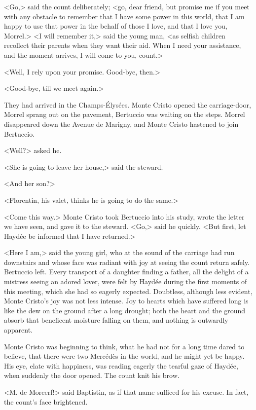  <Go,> said the count deliberately; <go, dear friend, but promise me if you meet with any obstacle to remember that I have some power in this world, that I am happy to use that power in the behalf of those I love, and that I love you, Morrel.>  <I will remember it,> said the young man, <as selfish children recollect their parents when they want their aid. When I need your assistance, and the moment arrives, I will come to you, count.> 

 <Well, I rely upon your promise. Good-bye, then.> 

 <Good-bye, till we meet again.> 

 They had arrived in the Champs-Élysées. Monte Cristo opened the carriage-door, Morrel sprang out on the pavement, Bertuccio was waiting on the steps. Morrel disappeared down the Avenue de Marigny, and Monte Cristo hastened to join Bertuccio. 

 <Well?> asked he. 

 <She is going to leave her house,> said the steward. 

 <And her son?> 

 <Florentin, his valet, thinks he is going to do the same.> 

 <Come this way.> Monte Cristo took Bertuccio into his study, wrote the letter we have seen, and gave it to the steward. <Go,> said he quickly. <But first, let Haydée be informed that I have returned.> 

 <Here I am,> said the young girl, who at the sound of the carriage had run downstairs and whose face was radiant with joy at seeing the count return safely. Bertuccio left. Every transport of a daughter finding a father, all the delight of a mistress seeing an adored lover, were felt by Haydée during the first moments of this meeting, which she had so eagerly expected. Doubtless, although less evident, Monte Cristo's joy was not less intense. Joy to hearts which have suffered long is like the dew on the ground after a long drought; both the heart and the ground absorb that beneficent moisture falling on them, and nothing is outwardly apparent. 

 Monte Cristo was beginning to think, what he had not for a long time dared to believe, that there were two Mercédès in the world, and he might yet be happy. His eye, elate with happiness, was reading eagerly the tearful gaze of Haydée, when suddenly the door opened. The count knit his brow. 

 <M. de Morcerf!> said Baptistin, as if that name sufficed for his excuse. In fact, the count's face brightened. 

